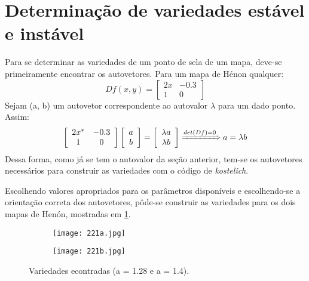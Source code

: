 \documentclass{article}[twocolumn]
\begin{document}
	\section{Determina\c{c}\~ao de variedades est\'avel e inst\'avel}
	Para se determinar as variedades de um ponto de sela de um mapa, deve-se primeiramente
	encontrar os autovetores. Para um mapa de H\'enon qualquer:
	\begin{equation}
		Df(x, y) = \left[\begin{array}{cc}
			2x & -0.3\\
			1 & 0
		\end{array}\right]
	\end{equation}
	Sejam (a, b) um autovetor correspondente ao autovalor $\lambda$ para um dado ponto. Assim:
	\begin{equation}
		\left[\begin{array}{cc}
			2x^{*} & -0.3\\
			1 & 0
		\end{array}\right]
		\left[\begin{array}{c}
			a \\ b
		\end{array}\right]
		= \left[\begin{array}{cc}
			\lambda a \\ \lambda b
		\end{array}\right]
		\xRightarrow{det(Df) = 0} a = \lambda b
		\nonumber
	\end{equation}
	Dessa forma, como j\'a se tem o autovalor da se\c{c}\~ao anterior, tem-se os autovetores
	necess\'arios para construir as variedades com o c\'odigo de \textit{kostelich}.

	Escolhendo valores apropriados para os par\^ametros dispon\'iveis e escolhendo-se a
	orienta\c{c}\~ao correta dos autovetores, p\^ode-se construir as variedades para os
	dois mapas de Hen\'on, mostradas em \ref{fig:manifolds}.
	\begin{figure}[H]
		\centering
		\begin{subfigure}
			\centering
			\texttt{[image: 221a.jpg]}
		\end{subfigure}
		\begin{subfigure}
			\centering
			\texttt{[image: 221b.jpg]}
		\end{subfigure}
		\caption{Variedades econtradas (a = 1.28 e a = 1.4).}
		\label{fig:manifolds}
	\end{figure}
\end{document}
